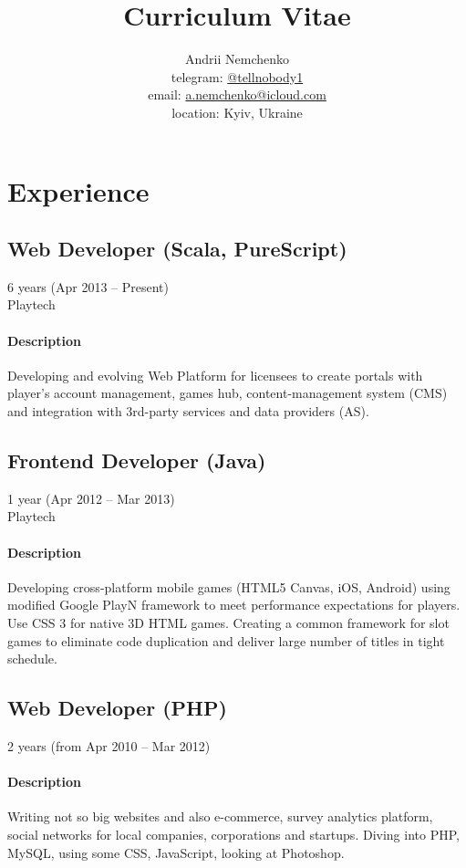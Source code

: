 

\title{Curriculum Vitae}
\author{
  Andrii Nemchenko\\
  telegram: \href{https://t.me/tellnobody1}{@tellnobody1}\\
  email: \href{mailto:a.nemchenko@icloud.com}{a.nemchenko@icloud.com}\\
  location: Kyiv, Ukraine
}
\maketitle
\section{Experience}
\subsection{Web Developer (Scala, PureScript)}
6 years (Apr 2013 – Present)\\
Playtech
\paragraph{Description}
Developing and evolving Web Platform for licensees to create portals with player's account management, games hub, content-management system (CMS) and integration with 3rd-party services and data providers (AS).
\subsection{Frontend Developer (Java)}
1 year (Apr 2012 – Mar 2013)\\Playtech
\paragraph{Description}
Developing cross-platform mobile games (HTML5 Canvas, iOS, Android) using modified Google PlayN framework to meet performance expectations for players. Use CSS 3 for native 3D HTML games. Creating a common framework for slot games to eliminate code duplication and deliver large number of titles in tight schedule.
\subsection{Web Developer (PHP)}
2 years (from Apr 2010 – Mar 2012)
\paragraph{Description}
Writing not so big websites and also e-commerce, survey analytics platform, social networks for local companies, corporations and startups. Diving into PHP, MySQL, using some CSS, JavaScript, looking at Photoshop.
